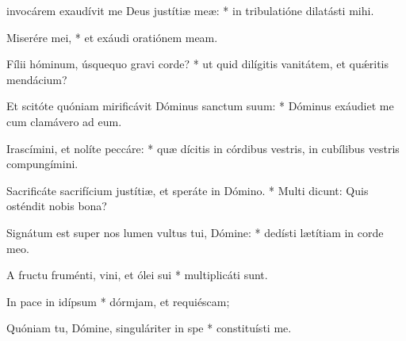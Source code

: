 \begin{psalmus}

     invocárem exaudívit me Deus justítiæ meæ: * in tribulatióne dilatásti mihi.

    Miserére mei, * et exáudi oratiónem meam.

    Fílii hóminum, úsquequo gravi corde? * ut quid dilígitis vanitátem, et quǽritis mendácium?

    Et scitóte quóniam mirificávit Dóminus sanctum suum: * Dóminus exáudiet me cum clamávero ad eum.

    Irascímini, et nolíte peccáre: * quæ dícitis in córdibus vestris, in cubílibus vestris compungímini.

    Sacrificáte sacrifícium justítiæ, et speráte in Dómino. * Multi dicunt: Quis osténdit nobis bona?

    Signátum est super nos lumen vultus tui, Dómine: * dedísti lætítiam in corde meo.

    A fructu fruménti, vini, et ólei sui * multiplicáti sunt.

    In pace in idípsum * dórmjam, et requiéscam;

    Quóniam tu, Dómine, singuláriter in spe * constituísti me.

\end{psalmus}
